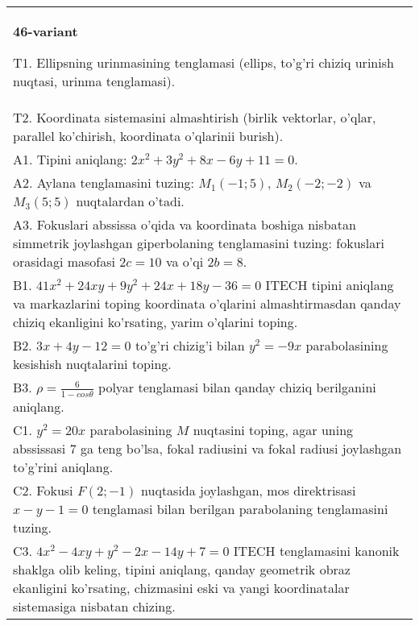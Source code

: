 \documentclass{article}
\begin{document}
\begin{tabular}{m{17cm}}
\textbf{46-variant}
\newline

T1. Ellipsning urinmasining tenglamasi (ellips, to'g'ri chiziq urinish nuqtasi, urinma tenglamasi).\\

T2. Koordinata sistemasini almashtirish (birlik vektorlar, o'qlar, parallel ko'chirish, koordinata o'qlarinii burish).\\

A1. Tipini aniqlang: $2x^{2}+3y^{2}+8x-6y+11=0$.\\

A2. Aylana tenglamasini tuzing: $M_1(-1;5)$, $M_2(-2;-2)$ va $M_3(5;5)$ nuqtalardan o'tadi.\\

A3. Fokuslari abssissa o'qida va koordinata boshiga nisbatan simmetrik joylashgan giperbolaning tenglamasini tuzing: fokuslari orasidagi masofasi $2c=10$ va o'qi $2b=8$.\\

B1. $41x^{2} + 24xy + 9y^{2} + 24x + 18y - 36 = 0$ ITECH tipini aniqlang va markazlarini toping koordinata o'qlarini almashtirmasdan qanday chiziq ekanligini ko'rsating, yarim o'qlarini toping.  \\

B2. $3x + 4y - 12 = 0$ to'g'ri chizig'i bilan $y^{2} = - 9x$ parabolasining kesishish nuqtalarini toping.  \\

B3. $\rho = \frac{6}{1 - cos\theta}$ polyar tenglamasi bilan qanday chiziq berilganini aniqlang.  \\

C1. $y^{2} = 20x$ parabolasining $M$ nuqtasini toping, agar uning abssissasi 7 ga teng bo'lsa, fokal radiusini va fokal radiusi joylashgan to'g'rini aniqlang.\\

C2. Fokusi $F(2; - 1)$ nuqtasida joylashgan, mos direktrisasi $x - y - 1 = 0$ tenglamasi bilan berilgan parabolaning tenglamasini tuzing.  \\

C3. $4x^{2} - 4xy + y^{2} - 2x - 14y + 7 = 0$ ITECH tenglamasini kanonik shaklga olib keling, tipini aniqlang, qanday geometrik obraz ekanligini ko'rsating, chizmasini eski va yangi koordinatalar sistemasiga nisbatan chizing.  \\

\end{tabular}
\vspace{1cm}
\end{document}
